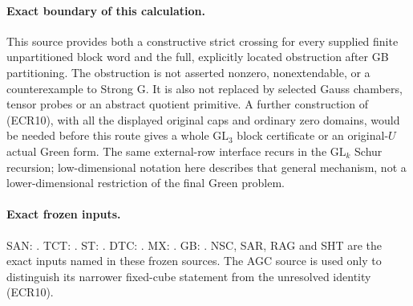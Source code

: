 \paragraph{Exact boundary of this calculation.}
This source provides both a constructive strict crossing for every
supplied finite unpartitioned block word and the full, explicitly
located obstruction after GB partitioning.  The obstruction is
not asserted nonzero, nonextendable, or a counterexample to Strong G.
It is also not replaced by selected Gauss chambers, tensor probes
or an abstract quotient primitive.  A further construction of
(ECR10), with all the displayed original caps and ordinary zero
domains, would be needed before this route gives a whole
$\mathrm{GL}_3$ block certificate or an original-$U$ actual
Green form.  The same external-row interface recurs in the
$\mathrm{GL}_k$ Schur recursion; low-dimensional notation here
describes that general mechanism, not a lower-dimensional
restriction of the final Green problem.

\paragraph{Exact frozen inputs.}
SAN: .
TCT: .
ST: .
DTC: .
MX: .
GB: .
NSC, SAR, RAG and SHT are the exact inputs named in these frozen
sources.  The AGC source is used only to distinguish its narrower
fixed-cube statement from the unresolved identity (ECR10).
